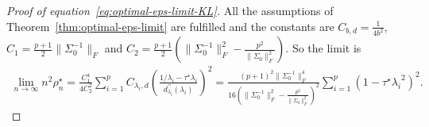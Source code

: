 \documentclass[11pt]{article}
\newcommand{\opt}{^\star}
\begin{document}
\begin{proof}[Proof of equation~\eqref{eq:optimal-eps-limit-KL}]
    All the assumptions of Theorem~\ref{thm:optimal-eps-limit} are fulfilled and the constants are $C_{b,d}=\frac{1}{4b^2}$, $C_1=\frac{p+1}{2}\|\Sigma_0^{-1}\|_F$ and $C_2=\frac{p+1}{2}\left(\|\Sigma_0^{-1}\|_F^2-\frac{p^2}{\|\Sigma_0\|_F^2}\right)$. So the limit is 
    \begin{align*}
        \lim_{n\to\infty} n^2  \rho_n\opt = \frac{C_1^4}{4C_2^2} \sum_{i=1}^p C_{\lambda_i, d} \left(\frac{1/\lambda_i-\tau\opt \lambda_i}{d_{\lambda_i}^{\prime\prime}(\lambda_i)} \right)^2 = \frac{(p+1)^2\|\Sigma_0^{-1}\|_F^4}{16\left(\|\Sigma_0^{-1}\|_F^2-\frac{p^2}{\|\Sigma_0\|_F^2}\right)^2}\sum_{i=1}^p \left(1-\tau\opt {\lambda_i}^2\right)^2.
    \end{align*}
\end{proof}
\end{document}
